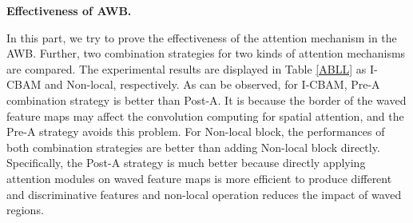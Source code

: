 \documentclass[journal]{IEEEtran}
\begin{document}
\textbf{Effectiveness of AWB.}\par 
In this part, we try to prove the effectiveness of the attention mechanism in the AWB. Further, two combination strategies for two kinds of attention mechanisms are compared. The experimental results are displayed in Table \ref{ABLL} as I-CBAM and Non-local, respectively. As can be observed, for I-CBAM, Pre-A combination strategy is better than Post-A. It is because the border of the waved feature maps may affect the convolution computing for spatial attention, and the Pre-A strategy avoids this problem. For Non-local block, the performances of both combination strategies are better than adding Non-local block directly. Specifically, the Post-A strategy is much better because directly applying attention modules on waved feature maps is more efficient to produce different and discriminative features and non-local operation reduces the impact of waved regions.










 



























\begin{table*}
\setlength{\abovecaptionskip}{0.3cm}
\setlength{\belowcaptionskip}{0.15cm}
\footnotesize
\centering
\caption{The average differences of two networks in Frobenius norm. ``Baseline" denotes single network,  i.e.  \ the difference is . ``Attention" or ``WaveBlock" denotes only attention mechanism or WaveBlock is used. ``WaveBlock-S" denotes the same  is generated for the two networks. ``AWB" denotes the combination of attention mechanism and WaveBlock.} 
\label{ABL-5}
\end{table*}
\end{document}
